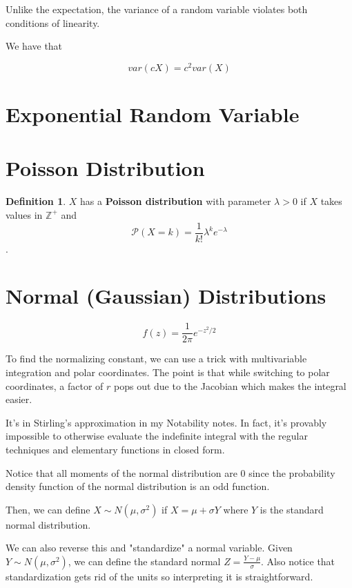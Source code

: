 \documentclass{article}
\theoremstyle{definition}
\newtheorem{definition}{Definition}
\newcommand{\Z}{\mathbb{Z}}
\newcommand{\Prob}{\mathcal{P}}
\begin{document}
Unlike the expectation, the variance of a random variable violates both conditions of linearity.

We have that

\[ var(cX) = c^{2}var(X)\]



\newpage

\section{Exponential Random Variable}

\newpage

\section{Poisson Distribution}

\begin{definition}
    $X$ has a \textbf{Poisson distribution} with parameter $\lambda > 0$ if $X$ takes values
    in $\Z^{+}$ and \[\Prob(X = k) = \frac{1}{k!}\lambda^{k}e^{-\lambda}\].
\end{definition}



\newpage

\section{Normal (Gaussian) Distributions}

\[ f(z) = \frac{1}{2\pi}e^{-z^{2}/2}\]

To find the normalizing constant, we can use a trick with multivariable integration and
polar coordinates. The point is that while switching to polar coordinates, a factor of $r$
pops out due to the Jacobian which makes the integral easier.

It's in Stirling's approximation in my Notability notes. In fact, it's provably
impossible to otherwise evaluate the indefinite integral with the regular techniques and elementary
functions in closed form.

Notice that all moments of the normal distribution are 0 since the probability density function
of the normal distribution is an odd function.

Then, we can define $X \sim N(\mu, \sigma^{2})$ if $X = \mu + \sigma Y$ where $Y$ is the
standard normal distribution.

We can also reverse this and "standardize" a normal variable. Given $Y \sim N(\mu, \sigma^{2})$,
we can define the standard normal $Z = \frac{Y - \mu}{\sigma}$. Also notice that standardization
gets rid of the units so interpreting it is straightforward.
\end{document}
